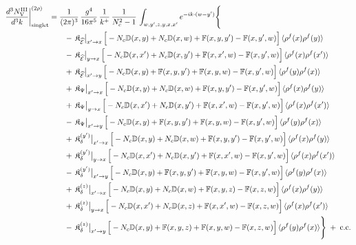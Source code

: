 \documentclass[9pt]{article}
\def\mf#1{\mathbb{#1}}
\numberwithin{equation}{section}
\begin{document}
{\begin{align}
\frac{d^{3}N^{\rm III}_{\rm V}}{d^{3}k}\bigg|^{(2\rho)}_{\rm singlet}&=\frac{1}{(2\pi)^{3}}\,\frac{g^{4}}{16\pi^{5}}\,\frac{1}{k^{+}}\,\frac{1}{N_{c}^{2}-1}\,\int_{w,y',z,y,x,x'}e^{-ik\cdot(w-y')}\Bigg\{\notag\\
&\qquad -\,\mathfrak{K}_{\widehat{\mathcal{E}}}\big|_{x'\to x}\,\Big[-N_{c}\mf{D}(x,y)+N_{c}\mf{D}(x,w)+\mf{F}(x,y,y')-\mf{F}(x,y',w)\Big]\,\langle\rho^{f}(x)\rho^{f}(y)\rangle\notag\\
&\qquad -\,\mathfrak{K}_{\widehat{\mathcal{E}}}\big|_{y\to x}\,\Big[-N_{c}\mf{D}(x,x')+N_{c}\mf{D}(x,y')+\mf{F}(x,x',w)-\mf{F}(x,y',w)\Big]\,\langle\rho^{f}(x)\rho^{f}(x')\rangle\notag\\
&\qquad +\,\mathfrak{K}_{\widehat{\mathcal{E}}}\big|_{x'\to y}\,\Big[-N_{c}\mf{D}(x,y)+\mf{F}(x,y,y')+\mf{F}(x,y,w)-\mf{F}(x,y',w)\Big]\,\langle\rho^{f}(y)\rho^{f}(x)\rangle\notag\\
&\qquad +\,\mathfrak{K}_{\Psi}\big|_{x'\to x}\,\Big[-N_{c}\mf{D}(x,y)+N_{c}\mf{D}(x,w)+\mf{F}(x,y,y')-\mf{F}(x,y',w)\Big]\,\langle\rho^{f}(x)\rho^{f}(y)\rangle\notag\\
&\qquad +\,\mathfrak{K}_{\Psi}\big|_{y\to x}\,\Big[-N_{c}\mf{D}(x,x')+N_{c}\mf{D}(x,y')+\mf{F}(x,x',w)-\mf{F}(x,y',w)\Big]\,\langle\rho^{f}(x)\rho^{f}(x')\rangle\notag\\
&\qquad -\,\mathfrak{K}_{\Psi}\big|_{x'\to y}\,\Big[-N_{c}\mf{D}(x,y)+\mf{F}(x,y,y')+\mf{F}(x,y,w)-\mf{F}(x,y',w)\Big]\,\langle\rho^{f}(y)\rho^{f}(x)\rangle\notag\\
&\qquad +\,\mathfrak{K}_{\delta}^{(y')}\big|_{x'\to x}\,\Big[-N_{c}\mf{D}(x,y)+N_{c}\mf{D}(x,w)+\mf{F}(x,y,y')-\mf{F}(x,y',w)\Big]\,\langle\rho^{f}(x)\rho^{f}(y)\rangle\notag\\
&\qquad +\,\mathfrak{K}_{\delta}^{(y')}\big|_{y\to x}\,\Big[-N_{c}\mf{D}(x,x')+N_{c}\mf{D}(x,y')+\mf{F}(x,x',w)-\mf{F}(x,y',w)\Big]\,\langle\rho^{f}(x)\rho^{f}(x')\rangle\notag\\
&\qquad -\,\mathfrak{K}_{\delta}^{(y')}\big|_{x'\to y}\,\Big[-N_{c}\mf{D}(x,y)+\mf{F}(x,y,y')+\mf{F}(x,y,w)-\mf{F}(x,y',w)\Big]\,\langle\rho^{f}(y)\rho^{f}(x)\rangle\notag\\
&\qquad +\,\mathfrak{K}_{\delta}^{(z)}\big|_{x'\to x}\,\Big[-N_{c}\mf{D}(x,y)+N_{c}\mf{D}(x,w)+\mf{F}(x,y,z)-\mf{F}(x,z,w)\Big]\,\langle\rho^{f}(x)\rho^{f}(y)\rangle\notag\\
&\qquad +\,\mathfrak{K}_{\delta}^{(z)}\big|_{y\to x}\,\Big[-N_{c}\mf{D}(x,x')+N_{c}\mf{D}(x,z)+\mf{F}(x,x',w)-\mf{F}(x,z,w)\Big]\,\langle\rho^{f}(x)\rho^{f}(x')\rangle\notag\\
&\qquad -\,\mathfrak{K}_{\delta}^{(z)}\big|_{x'\to y}\,\Big[-N_{c}\mf{D}(x,y)+\mf{F}(x,y,z)+\mf{F}(x,y,w)-\mf{F}(x,z,w)\Big]\,\langle\rho^{f}(y)\rho^{f}(x)\rangle\Bigg\}\;+\;{\rm c.c.}\label{eq:s-III-V}
\end{align}

}
\end{document}
